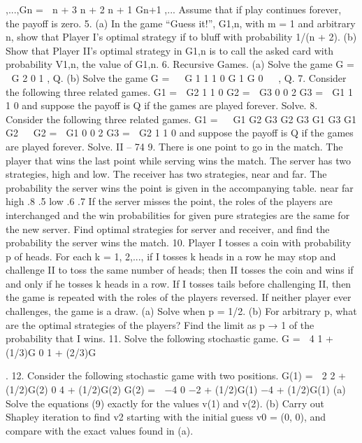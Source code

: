 \documentclass[]{report}
\begin{document}
,...,Gn =
 n + 3 n + 2
n + 1 Gn+1
,...
Assume that if play continues forever, the payoff is zero.
5. (a) In the game “Guess it!”, G1,n, with m = 1 and arbitrary n, show that Player
I’s optimal strategy if to bluff with probability 1/(n + 2).
(b) Show that Player II’s optimal strategy in G1,n is to call the asked card with
probability V1,n, the value of G1,n.
6. Recursive Games. (a) Solve the game G =
 G 2
0 1
, Q.
(b) Solve the game G =
⎛
⎝
G 1 1
1 0 G
1 G 0
⎞
⎠ , Q.
7. Consider the following three related games.
G1 =
 G2 1
1 0
G2 =
 G3 0
0 2
G3 =
 G1 1
1 0
and suppose the payoff is Q if the games are played forever. Solve.
8. Consider the following three related games.
G1 =
⎛
⎝
G1 G2 G3
G2 G3 G1
G3 G1 G2
⎞
⎠ G2 =
 G1 0
0 2
G3 =
 G2 1
1 0
and suppose the payoff is Q if the games are played forever. Solve.
II – 74
9. There is one point to go in the match. The player that wins the last point while
serving wins the match. The server has two strategies, high and low. The receiver has
two strategies, near and far. The probability the server wins the point is given in the
accompanying table.
near far
high .8 .5
low .6 .7
If the server misses the point, the roles of the players are interchanged and the win probabilities
for given pure strategies are the same for the new server. Find optimal strategies
for server and receiver, and find the probability the server wins the match.
10. Player I tosses a coin with probability p of heads. For each k = 1, 2,..., if I tosses
k heads in a row he may stop and challenge II to toss the same number of heads; then II
tosses the coin and wins if and only if he tosses k heads in a row. If I tosses tails before
challenging II, then the game is repeated with the roles of the players reversed. If neither
player ever challenges, the game is a draw.
(a) Solve when p = 1/2.
(b) For arbitrary p, what are the optimal strategies of the players? Find the limit as p → 1
of the probability that I wins.
11. Solve the following stochastic game.
G =
 4 1 + (1/3)G
0 1 + (2/3)G

.
12. Consider the following stochastic game with two positions.
G(1) =
 2 2 + (1/2)G(2)
0 4 + (1/2)G(2)
G(2) =
 −4 0
−2 + (1/2)G(1) −4 + (1/2)G(1)
(a) Solve the equations (9) exactly for the values v(1) and v(2).
(b) Carry out Shapley iteration to find v2 starting with the initial guess v0 = (0, 0),
and compare with the exact values found in (a).
\end{document}
